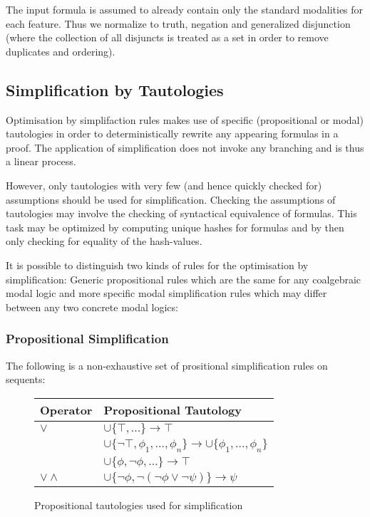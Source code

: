 \documentclass{llncs}
\begin{document}
The input formula is assumed to already contain only the standard modalities
for each feature. Thus we normalize to truth, negation and
generalized disjunction (where the collection of all disjuncts is treated as a set
in order to remove duplicates and ordering).

\subsection{Simplification by Tautologies}

Optimisation by simplifaction rules makes use of specific (propositional or modal)
tautologies in order to deterministically rewrite any appearing formulas in a proof.
The application of simplification does not invoke any branching and is thus a
linear process.

However, only tautologies with very few (and hence quickly checked for) assumptions
should be used for simplification. Checking the assumptions of tautologies may involve
the checking of syntactical equivalence of formulas. This task may be optimized by
computing unique hashes for formulas and by then only checking for equality of
the hash-values.

It is possible to distinguish two kinds of rules for the optimisation by simplification:
Generic propositional rules which are the same for any coalgebraic modal logic
and more specific modal simplification rules which may differ between any two concrete
modal logics:

\subsubsection{Propositional Simplification}

The following is a non-exhaustive set of prositional simplification rules on sequents:

\begin{footnotesize}
\begin{figure}[!h]
  \begin{center}
\begin{tabular}{| l | l |}
\hline
Operator & Propositional Tautology \\
\hline
$\vee$ & $\cup\{\top,...\}\rightarrow \top$ \\
&  $\cup\{\neg\top,\phi_1,\ldots,\phi_n\}\rightarrow \cup\{\phi_1,\ldots,\phi_n\}$ \\
&  $\cup\{\phi,\neg\phi,\ldots\}\rightarrow \top$ \\
\hline
$\vee\wedge$ & $\cup\{\neg\phi,\neg(\neg\phi\vee\neg\psi)\}\rightarrow\psi$\\
\hline
 \end{tabular}
  \end{center}
  \caption{Propositional tautologies used for simplification}
  \label{fig:propTauts}
\end{figure}
\end{footnotesize}
\end{document}
